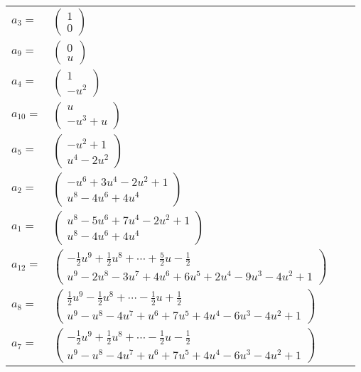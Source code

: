 \documentclass[1p]{elsarticle_modified}
\theoremstyle{definition}
\begin{document}
\begin{tabular}{m{7pt} m{180pt} m{7pt} m{180pt} }
\flushright $a_{3}=$&$\begin{pmatrix}1\\0\end{pmatrix}$ \\
\flushright $a_{9}=$&$\begin{pmatrix}0\\u\end{pmatrix}$ \\
\flushright $a_{4}=$&$\begin{pmatrix}1\\- u^2\end{pmatrix}$ \\
\flushright $a_{10}=$&$\begin{pmatrix}u\\- u^3+u\end{pmatrix}$ \\
\flushright $a_{5}=$&$\begin{pmatrix}- u^2+1\\u^4-2 u^2\end{pmatrix}$ \\
\flushright $a_{2}=$&$\begin{pmatrix}- u^6+3 u^4-2 u^2+1\\u^8-4 u^6+4 u^4\end{pmatrix}$ \\
\flushright $a_{1}=$&$\begin{pmatrix}u^8-5 u^6+7 u^4-2 u^2+1\\u^8-4 u^6+4 u^4\end{pmatrix}$ \\
\flushright $a_{12}=$&$\begin{pmatrix}-\frac{1}{2} u^9+\frac{1}{2} u^8+\cdots+\frac{5}{2} u-\frac{1}{2}\\u^9-2 u^8-3 u^7+4 u^6+6 u^5+2 u^4-9 u^3-4 u^2+1\end{pmatrix}$ \\
\flushright $a_{8}=$&$\begin{pmatrix}\frac{1}{2} u^9-\frac{1}{2} u^8+\cdots-\frac{1}{2} u+\frac{1}{2}\\u^9- u^8-4 u^7+u^6+7 u^5+4 u^4-6 u^3-4 u^2+1\end{pmatrix}$ \\
\flushright $a_{7}=$&$\begin{pmatrix}-\frac{1}{2} u^9+\frac{1}{2} u^8+\cdots-\frac{1}{2} u-\frac{1}{2}\\u^9- u^8-4 u^7+u^6+7 u^5+4 u^4-6 u^3-4 u^2+1\end{pmatrix}$ \\

\end{tabular}
\end{document}
